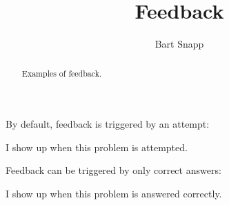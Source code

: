 \documentclass{ximera}
\title[Examples:]{Feedback}
\author{Bart Snapp}
\begin{document}
\begin{abstract}
  Examples of feedback.
\end{abstract}
\maketitle

By default, feedback is triggered by an attempt:
\begin{exercise}
  \begin{multipleChoice}
  \end{multipleChoice}
  \begin{feedback}
    I show up when this problem is attempted. 
  \end{feedback}
\end{exercise}


Feedback can be triggered by only correct answers:
\begin{exercise}
  \begin{multipleChoice}
  \end{multipleChoice}
  \begin{feedback}[correct]
    I show up when this problem is answered correctly.
  \end{feedback}
\end{exercise}
\end{document}
